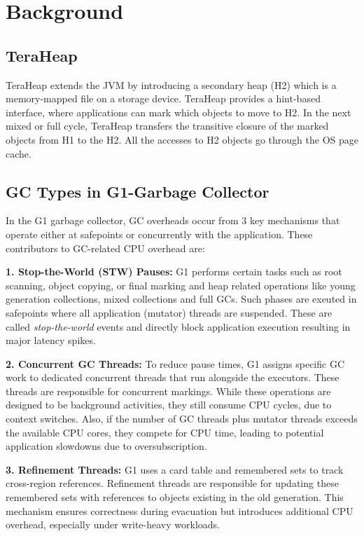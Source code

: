 \section{Background}



\subsection{TeraHeap}
TeraHeap extends the JVM  by introducing a
secondary heap (H2) which is a memory-mapped file on a storage device. TeraHeap
provides a hint-based interface, where applications can mark which objects to
move to H2. In the next mixed or full \gc{} cycle, TeraHeap transfers the
transitive closure of the marked objects from H1 to the H2. All the accesses to
H2 objects go through the OS page cache.

\subsection{GC Types in G1-Garbage Collector} In the G1 garbage collector, GC
overheads occur from 3 key mechanisms that operate either at safepoints or
concurrently with the application. These contributors to GC-related CPU
overhead are:

\textbf{1. Stop-the-World (STW) Pauses:}  G1 performs certain tasks such as
root scanning, object copying, or final marking and heap related operations
like young generation collections, mixed collections and full GCs. Such phases
are exeuted in safepoints where all application (mutator) threads are
suspended. These are called \emph{stop-the-world} events and directly block
application execution resulting in major latency spikes.

\textbf{2. Concurrent GC Threads:}  To reduce pause times, G1 assigns specific
GC work to dedicated concurrent threads that run alongside the executors. These
threads are responsible for concurrent markings. While these operations are
designed to be background activities, they still consume CPU cycles, due to
context switches. Also, if the number of GC threads plus mutator threads
exceeds the available CPU cores, they compete for CPU time, leading to
potential application slowdowns due to oversubscription.

\textbf{3. Refinement Threads:}  G1 uses a card table and remembered sets to
track cross-region references. Refinement threads are responsible for updating
these remembered sets with references to objects existing in the old
generation. This mechanism ensures correctness during evacuation but introduces
additional CPU overhead, especially under write-heavy workloads.


